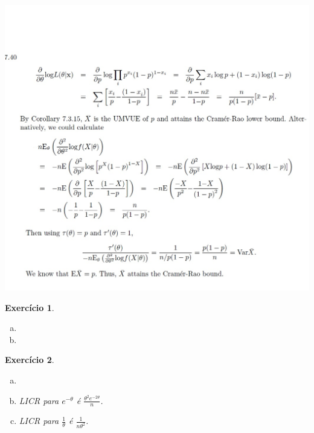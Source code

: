 \documentclass[letter,11pt]{article}
\newtheorem{exer}{Exercício}
\begin{document}
\includegraphics[scale=0.5]{gabarito_casella7_40.jpg}


\begin{exer} \rm
\begin{enumerate}[a)] 
\item %

\item %
\end{enumerate}

\end{exer}


\begin{exer} \rm

\begin{enumerate}[a)] 

\item %

\item %
  LICR para $e^{-\theta}$ é $\frac{\theta^2e^{-2\theta}}{n}$.

\item %
LICR para $\frac{1}{\theta}$ é  $\frac{1}{n\theta^2}$.

\end{enumerate}

\end{exer}
\end{document}
